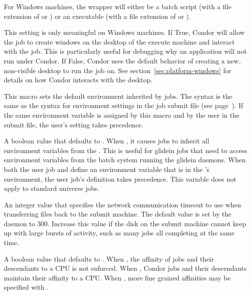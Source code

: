 \begin{description}
  For Windows machines, the wrapper will either be
  a batch script (with a file extension of  or )
  or an executable (with a file extension of  or ).

\label{param:UseVisibleDesktop} 
\item[\Macro{USE\_VISIBLE\_DESKTOP}]
  This setting is only meaningful on Windows machines.  If True, Condor will
  allow the job to create windows on the desktop of the execute machine and
  interact with the job.  This is particularly useful for debugging why an
  application will not run under Condor.  If False, Condor uses the default
  behavior of creating a new, non-visible desktop to run the job on.
  See section~\ref{sec:platform-windows} for details on how Condor 
  interacts with the desktop.

\label{param:StarterJobEnvironment}
\item[\Macro{STARTER\_JOB\_ENVIRONMENT}]
  This macro sets the default environment inherited by jobs.  The syntax is
  the same as the syntax for environment settings in the job submit file
  (see page~\pageref{man-condor-submit-environment}).
  If the same environment variable is assigned by this macro and by the user
  in the submit file, the user's setting takes precedence.

\label{param:JobInheritsStarterEnvironment} 
\item[\Macro{JOB\_INHERITS\_STARTER\_ENVIRONMENT}]
  A boolean value that defaults to .
  When ,
  it causes jobs to inherit all environment variables from 
  the .
  This is useful for glidein jobs that need to
  access environment variables from the batch system running the glidein
  daemons.
  When both the user job and  define
  an environment variable that is in the 's
  environment, the user job's definition takes precedence.
  This variable does not apply to standard universe jobs.

\label{param:StarterUploadTimeout} 
\item[\Macro{STARTER\_UPLOAD\_TIMEOUT}]
  An integer value that specifies the network communication timeout to use
  when transferring files back to the submit machine.  The default value is
  set by the  daemon to 300.
  Increase this value if the disk on the submit machine
  cannot keep up with large bursts of activity, such as many jobs all
  completing at the same time.

\label{param:EnforceCpuAffinity} 
\item[\Macro{ENFORCE\_CPU\_AFFINITY}]
  A boolean value that defaults to .  When ,
  the affinity of jobs and their descendants to a CPU is not enforced.
  When , Condor jobs and their descendants maintain their
  affinity to a CPU.
  When , more fine grained affinities may be specified with
  .


\end{description}
